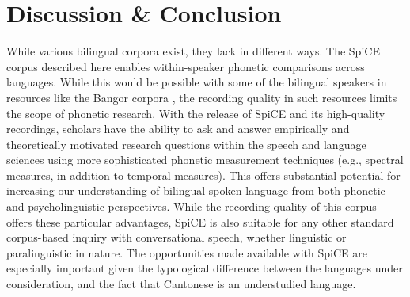 \section{Discussion \& Conclusion}\label{ch2:subsec:discussion}

While various bilingual corpora exist, they lack in different ways. The SpiCE corpus described here enables within-speaker phonetic comparisons across languages. While this would be possible with some of the bilingual speakers in resources like the Bangor corpora \citep{deuchar_2014_corpora}, the recording quality in such resources limits the scope of phonetic research. With the release of SpiCE and its high-quality recordings, scholars have the ability to ask and answer empirically and theoretically motivated research questions within the speech and language sciences using more sophisticated phonetic measurement techniques (e.g., spectral measures, in addition to temporal measures). This offers substantial potential for increasing our understanding of bilingual spoken language from both phonetic and psycholinguistic perspectives. While the recording quality of this corpus offers these particular advantages, SpiCE is also suitable for any other standard corpus-based inquiry with conversational speech, whether linguistic or paralinguistic in nature. The opportunities made available with SpiCE are especially important given the typological difference between the languages under consideration, and the fact that Cantonese is an understudied language. 

\endinput %
